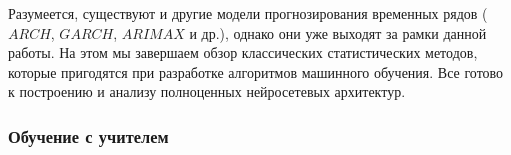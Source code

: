 Разумеется, существуют и другие модели прогнозирования временных рядов  ($ARCH$, $GARCH$, 
$ARIMAX$ и др.), однако они уже выходят за рамки данной работы. На этом мы завершаем обзор 
классических статистических методов, которые пригодятся при разработке алгоритмов машинного обучения. 
Все готово к построению и анализу полноценных нейросетевых архитектур.

\subsubsection{\color{red}Обучение с учителем}










